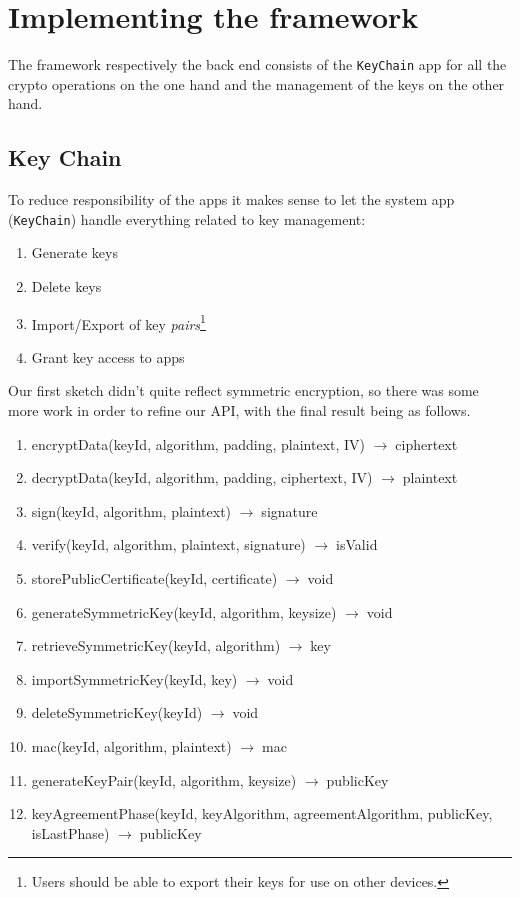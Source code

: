 \documentclass[a4paper]{scrartcl}
\newcommand{\totype}{\(\to\;\)}
\begin{document}
\section{Implementing the framework}

	The framework respectively the back end consists of the \texttt{KeyChain} app for all the crypto operations on the one hand and the management of the keys on the other hand.

	\subsection{Key Chain}
		To reduce responsibility of the apps it makes sense to let the system app (\texttt{KeyChain}) handle everything related to key management:
		\begin{enumerate}
			\item Generate keys
			\item Delete keys
			\item Import/Export of key \emph{pairs}\footnote{Users should be able to export their keys for use on other devices.}
			\item Grant key access to apps
		\end{enumerate}
		Our first sketch didn't quite reflect symmetric encryption, so there was some more work in order to refine our API, with the final result being as follows.

		\begin{enumerate}
		\tt
			\item encryptData(keyId, algorithm, padding, plaintext, IV) \totype ciphertext
			\item decryptData(keyId, algorithm, padding, ciphertext, IV) \totype plaintext
			\item sign(keyId, algorithm, plaintext) \totype signature
			\item verify(keyId, algorithm, plaintext, signature) \totype isValid
			\item storePublicCertificate(keyId, certificate) \totype void

			\item generateSymmetricKey(keyId, algorithm, keysize) \totype void
			\item retrieveSymmetricKey(keyId, algorithm) \totype key
			\item importSymmetricKey(keyId, key) \totype void
			\item deleteSymmetricKey(keyId) \totype void
			\item mac(keyId, algorithm, plaintext) \totype mac

			\item generateKeyPair(keyId, algorithm, keysize) \totype publicKey
			\item keyAgreementPhase(keyId, keyAlgorithm, agreementAlgorithm,
				\linebreak %
				publicKey, isLastPhase) \totype publicKey
		\end{enumerate}
\end{document}
